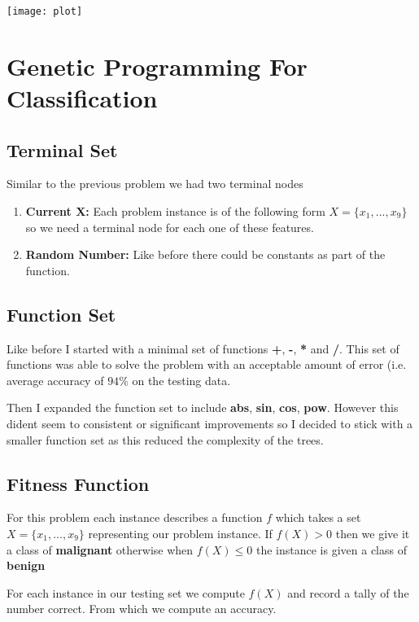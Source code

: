 \documentclass[a4paper, 12pt]{article}
\begin{document}
			\begin{center}
				\texttt{[image: plot]}
			\end{center}
			
			
	\section{Genetic Programming For Classification}
			
		\subsection{Terminal Set}
			Similar to the previous problem we had two terminal nodes
			
			\begin{enumerate}
				\item \textbf{Current X:} Each problem instance is of the following form $X = \{x_1,...,x_9\}$ so we need a terminal node for each one of these features.
				
				\item \textbf{Random Number:} Like before there could be constants as part of the function. 
			\end{enumerate}
		\subsection{Function Set}			
			Like before I started with a minimal set of functions \textbf{+}, \textbf{-}, \textbf{*} and \textbf{/}. This set of functions was able to solve the problem with an acceptable amount of error (i.e. average accuracy of $94\%$ on the testing data.
			
			Then I expanded the function set to include \textbf{abs}, \textbf{sin}, \textbf{cos}, \textbf{pow}. However this dident seem to consistent or significant improvements so I decided to stick with a smaller function set as this reduced the complexity of the trees.		
			
		\subsection{Fitness Function}
			For this problem each instance describes a function $f$ which takes a set $X = \{x_1,...,x_9\}$ representing our problem instance. If $f(X) > 0$ then we give it a class of \textbf{malignant} otherwise when $f(X) \leq 0$ the instance is given a class of \textbf{benign}
			
			For each instance in our testing set we compute $f(X)$ and record a tally of the number correct. From which we compute an accuracy.
			
\end{document}
